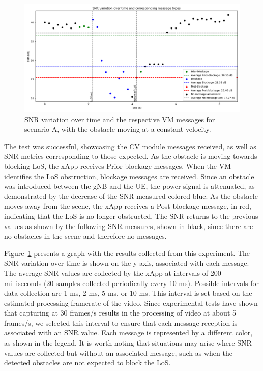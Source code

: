 \begin{figure}[H]
    \centering
    \includegraphics[width=\linewidth]{figures/results_0}
    \caption{SNR variation over time and the respective VM messages for scenario A, with the obstacle moving at a constant velocity.}
    \label{fig:results_0}
\end{figure}


The test was successful, showcasing the CV module messages received, as well as SNR metrics corresponding to those expected.
As the obstacle is moving towards blocking LoS, the xApp receives Prior-blockage messages.
When the VM identifies the LoS obstruction, blockage messages are received.
Since an obstacle was introduced between the gNB and the UE, the power signal is attenuated, as demonstrated by the decrease of the SNR measured colored blue.
As the obstacle moves away from the scene, the xApp receives a Post-blockage message, in red, indicating that the LoS is no longer obstructed.
The SNR returns to the previous values as shown by the following SNR measures, shown in black, since there are no obstacles in the scene and therefore no messages.


Figure~\ref{fig:results_0} presents a graph with the results collected from this experiment.
The SNR variation over time is shown on the y-axis, associated with each message.
The average SNR values are collected by the xApp at intervals of 200 milliseconds (20 samples collected periodically every 10 ms).
Possible intervals for data collection are 1 ms, 2 ms, 5 ms, or 10 ms.
This interval is set based on the estimated processing framerate of the video.
Since experimental tests have shown that capturing at 30 frames/s results in the processing of video at about 5 frames/s, we selected this interval to ensure that each message reception is associated with an SNR value.
Each message is represented by a different color, as shown in the legend.
It is worth noting that situations may arise where SNR values are collected but without an associated message, such as when the detected obstacles are not expected to block the LoS\@.

